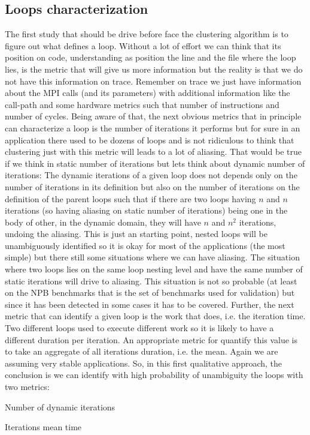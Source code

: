 \subsection{Loops characterization}\label{ss:loops_characterzation}

The first study that should be drive before face the clustering algorithm is to
figure out what defines a loop. Without a lot of effort we can think that its
position on code, understanding as position the line and the file where the loop
lies, is the metric that will give us more information but the reality is that 
we do not have this information on trace. Remember on trace we just have 
information about the MPI calls (and its parameters) 
with additional information like the call-path and some hardware metrics such 
that number of instructions and number of cycles. Being aware of that, the next
obvious metrics that in principle can characterize a loop is the number of
iterations it performs but for sure in an application there used to be dozens of
loops and is not ridiculous to think that clustering just with this metric will
leads to a lot of aliasing. That would be true if we think in static number of
iterations but lets think about dynamic number of iterations: The dynamic
iterations of a given loop does not depends only on the number of iterations in
its definition but also on the number of iterations on the definition of the
parent loops such that if there are two loops having $n$ and $n$ iterations (so
having aliasing on static number of iterations) being one in the body of
other, in the dynamic domain, they will have $n$ and $n^2$ iterations, undoing the aliasing.
This is just an starting point, nested loops will be unambiguously identified so
it is okay for most of the applications (the most simple) but there still some
situations where we can have aliasing. The situation where two loops
lies on the same loop nesting level and have the same number of static
iterations will drive to aliasing. This situation is not so probable (at least
on the NPB benchmarks that is the set of benchmarks used for validation) but
since it has been detected in some cases it has to be covered. Further, the next
metric that can identify a given loop is the work that does, i.e. the
iteration time. Two different loops used to execute different work so it is
likely to have a different duration per iteration. An appropriate metric for
quantify this value is to take an aggregate of all iterations duration, i.e.
the mean. Again we are assuming very stable applications. So, in this first 
qualitative approach, the conclusion is we can identify with high probability of 
unambiguity the loops with two metrics:
\begin{enumerate*}[label=\roman*)] 
  \item Number of dynamic iterations
  \item Iterations mean time
\end{enumerate*}

